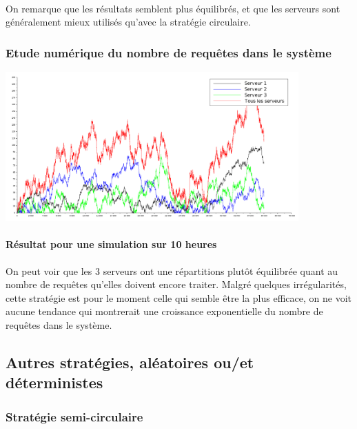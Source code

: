 \documentclass{article}
\begin{document}
\paragraph{}
On remarque que les résultats semblent plus équilibrés, et que les serveurs sont généralement mieux utilisés qu'avec la stratégie circulaire.

\subsubsection{Etude numérique du nombre de requêtes dans le système}

\begin{center}
	\includegraphics[width=425px]{img/aleatls.png}
\end{center}
\paragraph{Résultat pour une simulation sur 10 heures}
On peut voir que les 3 serveurs ont une répartitions plutôt équilibrée quant au nombre de requêtes qu'elles doivent encore traiter. Malgré quelques irrégularités, cette stratégie est pour le moment celle qui semble être la plus efficace, on ne voit aucune tendance qui montrerait une croissance exponentielle du nombre de requêtes dans le système.  

\subsection{Autres stratégies, aléatoires ou/et déterministes}

\subsubsection{Stratégie semi-circulaire}
\end{document}
